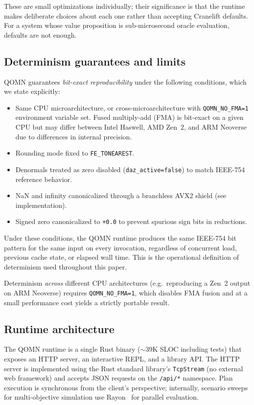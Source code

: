 \documentclass[11pt,a4paper]{article}
\begin{document}
These are small optimizations individually; their significance is that the runtime makes deliberate choices about each one rather than accepting Cranelift defaults. For a system whose value proposition is sub-microsecond oracle evaluation, defaults are not enough.

\subsection{Determinism guarantees and limits}
\label{sec:determinism}

QOMN guarantees \emph{bit-exact reproducibility} under the following conditions, which we state explicitly:

\begin{itemize}[leftmargin=*]
\item Same CPU microarchitecture, or cross-microarchitecture with \texttt{QOMN\_NO\_FMA=1} environment variable set. Fused multiply-add (FMA) is bit-exact on a given CPU but may differ between Intel Haswell, AMD Zen~2, and ARM Neoverse due to differences in internal precision.
\item Rounding mode fixed to \texttt{FE\_TONEAREST}.
\item Denormals treated as zero disabled (\texttt{daz\_active=false}) to match IEEE-754 reference behavior.
\item NaN and infinity canonicalized through a branchless AVX2 shield (see implementation).
\item Signed zero canonicalized to \texttt{+0.0} to prevent spurious sign bits in reductions.
\end{itemize}

Under these conditions, the QOMN runtime produces the same IEEE-754 bit pattern for the same input on every invocation, regardless of concurrent load, previous cache state, or elapsed wall time. This is the operational definition of determinism used throughout this paper.

Determinism \emph{across} different CPU architectures (e.g.\ reproducing a Zen~2 output on ARM Neoverse) requires \texttt{QOMN\_NO\_FMA=1}, which disables FMA fusion and at a small performance cost yields a strictly portable result.

\subsection{Runtime architecture}

The QOMN runtime is a single Rust binary ($\sim$39K SLOC including tests) that exposes an HTTP server, an interactive REPL, and a library API. The HTTP server is implemented using the Rust standard library's \texttt{TcpStream} (no external web framework) and accepts JSON requests on the \texttt{/api/*} namespace. Plan execution is synchronous from the client's perspective; internally, scenario sweeps for multi-objective simulation use Rayon~\cite{rayon} for parallel evaluation.
\end{document}
